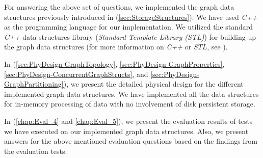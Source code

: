 {\begin{enumerate}
\end{enumerate}

For answering the above set of questions, we implemented the graph data structures previously introduced in (\ref{sec:StorageStructures}). We have used \textit{C++} as the programming language for our implementation. We utilized the standard \textit{C++} data structures library (\textit{Standard Template Library (STL)}) for building up the graph data structures (for more information on \textit{C++} or $STL$, see \cite{josuttis2012c++}). 

In (\ref{sec:PhyDesign-GraphTopology}, \ref{sec:PhyDesign-GraphProperties}, \ref{sec:PhyDesign-ConcurrentGraphStructs}, and \ref{sec:PhyDesign-GraphPartitioning}), we present the detailed physical design for the different implemented graph data structures. We have implemented all the data structures for in-memory processing of data with no involvement of disk persistent storage. 

In (\ref{chap:Eval_4} and \ref{chap:Eval_5}), we present the evaluation results of tests we have executed on our implemented graph data structures. Also, we present answers for the above mentioned evaluation questions based on the findings from the evaluation tests.


}
